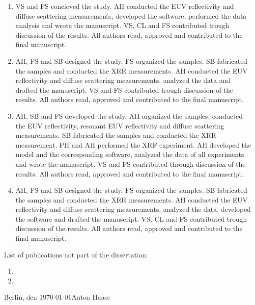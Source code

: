 \begin{enumerate}[label=\arabic*) ]
    \item {} 
	
	VS and FS concieved the study. AH conducted the EUV reflectivity and diffuse scattering measurements, developed the software, performed the data analysis and wrote the manuscript. VS, CL and FS contributed trough discussion of the results.
	All authors read, approved and contributed to the final manuscript.

    \item {} 
    
	AH, FS and SB designed the study. FS organized the samples. SB fabricated the samples and conducted the XRR measurements. AH conducted the EUV reflectivity and diffuse scattering measurements, analyzed the data and drafted the manuscript. VS and FS contributed trough discussion of the results. All authors read, approved and contributed to the final manuscript.

    \item {} 
    
	AH, SB and FS developed the study. AH organized the samples, conducted the EUV reflectivity, resonant EUV reflectivity and diffuse scattering measurements. SB fabricated the samples and conducted the XRR measurement. PH and AH performed the XRF experiment. AH developed the model and the corresponding software, analyzed the data of all experiments and wrote the manuscript. VS and FS contributed through discussion of the results. All authors read, approved and contributed to the final manuscript.

    \item {} 
    
	AH, FS and SB designed the study. FS organized the samples. SB fabricated the samples and conducted the XRR measurements. AH conducted the EUV reflectivity and diffuse scattering measurements, analyzed the data, developed the software and drafted the manuscript. VS, CL and FS contributed trough discussion of the results. All authors read, approved and contributed to the final manuscript.

\end{enumerate}
List of publications not part of the dissertation:
\begin{enumerate}[label=\arabic*) ]
    \item {} 

    \item {} 
    
\end{enumerate}

\vspace{3cm}

\noindent Berlin, den \today \hfill Anton Haase

\cleardoublepage
